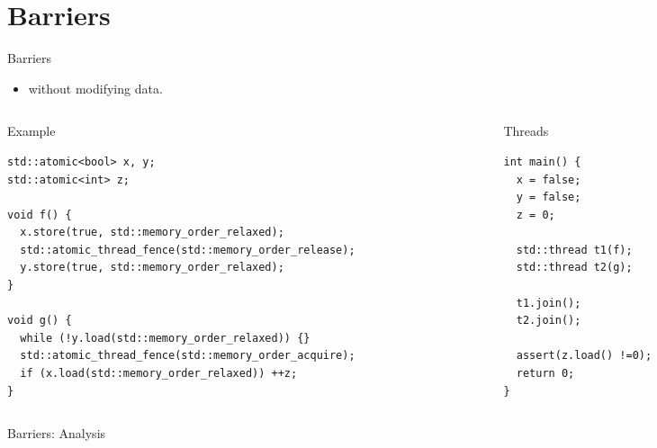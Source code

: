 \section{Barriers}

\begin{frame}[fragile]{Barriers}
\begin{itemize}
\item {}  without modifying data.
\end{itemize}

\begin{columns}

\begin{column}{.7\textwidth}
\begin{block}{Example}
\begin{lstlisting}[basicstyle=\tiny]
std::atomic<bool> x, y;
std::atomic<int> z;

void f() {
  x.store(true, std::memory_order_relaxed);
  std::atomic_thread_fence(std::memory_order_release);
  y.store(true, std::memory_order_relaxed);
}

void g() {
  while (!y.load(std::memory_order_relaxed)) {}
  std::atomic_thread_fence(std::memory_order_acquire);
  if (x.load(std::memory_order_relaxed)) ++z;
}
\end{lstlisting}
\end{block}
\end{column}

\begin{column}{.3\textwidth}
\begin{block}{Threads}
\begin{lstlisting}[basicstyle=\tiny]
int main() {
  x = false;
  y = false;
  z = 0;

  std::thread t1(f);
  std::thread t2(g);

  t1.join();
  t2.join();

  assert(z.load() !=0);
  return 0;
}
\end{lstlisting}
\end{block}
\end{column}

\end{columns}
\end{frame}

\begin{frame}{Barriers: Analysis}

\end{frame}
